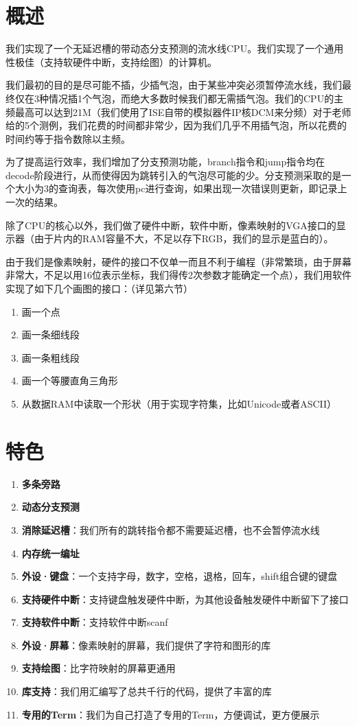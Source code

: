 \section{概述}

我们实现了一个无延迟槽的带动态分支预测的流水线CPU。我们实现了一个通用性极佳（支持软硬件中断，支持绘图）的计算机。

我们最初的目的是尽可能不插，少插气泡，由于某些冲突必须暂停流水线，我们最终仅在3种情况插1个气泡，而绝大多数时候我们都无需插气泡。我们的CPU的主频最高可以达到21M（我们使用了ISE自带的模拟器件IP核DCM来分频）对于老师给的5个测例，我们花费的时间都非常少，因为我们几乎不用插气泡，所以花费的时间约等于指令数除以主频。

为了提高运行效率，我们增加了分支预测功能，branch指令和jump指令均在decode阶段进行，从而使得因为跳转引入的气泡尽可能的少。分支预测采取的是一个大小为3的查询表，每次使用pc进行查询，如果出现一次错误则更新，即记录上一次的结果。

除了CPU的核心以外，我们做了硬件中断，软件中断，像素映射的VGA接口的显示器（由于片内的RAM容量不大，不足以存下RGB，我们的显示是蓝白的）。

由于我们是像素映射，硬件的接口不仅单一而且不利于编程（非常繁琐，由于屏幕非常大，不足以用16位表示坐标，我们得传2次参数才能确定一个点），我们用软件实现了如下几个画图的接口：（详见第六节）

\begin{enumerate}
    \item 画一个点
    \item 画一条细线段
    \item 画一条粗线段
    \item 画一个等腰直角三角形
    \item 从数据RAM中读取一个形状（用于实现字符集，比如Unicode或者ASCII）
\end{enumerate}

\section{特色}


\begin{enumerate}
    \item \textbf{多条旁路}
    \item \textbf{动态分支预测}
    \item \textbf{消除延迟槽}：我们所有的跳转指令都不需要延迟槽，也不会暂停流水线
    \item \textbf{内存统一编址}
    \item \textbf{外设·键盘}：一个支持字母，数字，空格，退格，回车，shift组合键的键盘
    \item \textbf{支持硬件中断}：支持键盘触发硬件中断，为其他设备触发硬件中断留下了接口
    \item \textbf{支持软件中断}：支持软件中断scanf
    \item \textbf{外设·屏幕}：像素映射的屏幕，我们提供了字符和图形的库
    \item \textbf{支持绘图}：比字符映射的屏幕更通用
    \item \textbf{库支持}：我们用汇编写了总共千行的代码，提供了丰富的库
    \item \textbf{专用的Term}：我们为自己打造了专用的Term，方便调试，更方便展示
\end{enumerate}